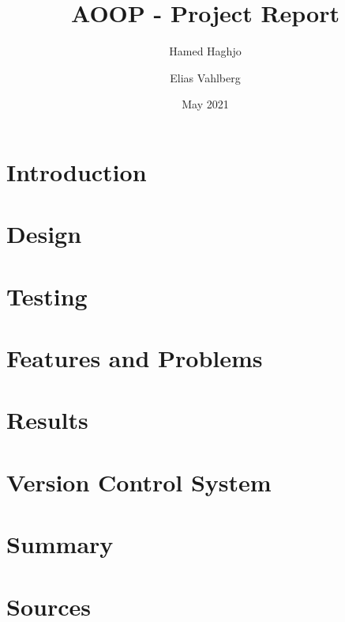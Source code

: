\documentclass{article}
\title{AOOP - Project Report}
\author{Hamed Haghjo \and Elias Vahlberg}
\date{May 2021}
\begin{document}
\maketitle
\tableofcontents

\newpage
\section{Introduction}


\newpage
\section{Design}


\newpage
\section{Testing}


\newpage
\section{Features and Problems}


\newpage
\section{Results}


\newpage
\section{Version Control System}


\newpage
\section{Summary}


\newpage
\section{Sources}

\end{document}
